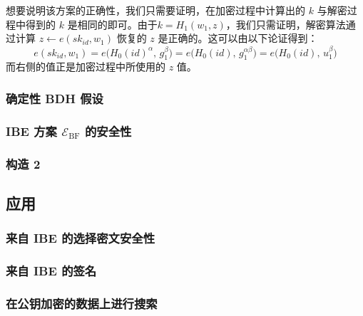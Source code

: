 想要说明该方案的正确性，我们只需要证明，在加密过程中计算出的 $k$ 与解密过程中得到的 $k$ 是相同的即可。由于$k=H_1(w_1,z)$，我们只需证明，解密算法通过计算 $z\leftarrow e(\mathit{sk}_\mathit{id},w_1)$ 恢复的 $z$ 是正确的。这可以由以下论证得到：
\[
e(\mathit{sk}_\mathit{id},w_1)
=e\big(H_0(\mathit{id})^\alpha,\,g_1^\beta\big)
=e\big(H_0(\mathit{id}),\,g_1^{\alpha\beta}\big)
=e\big(H_0(\mathit{id}),\,u_1^\beta\big)
\]
而右侧的值正是加密过程中所使用的 $z$ 值。

\subsubsection{确定性 BDH 假设}\label{subsubsec:15-6-3-2}

\begin{game}\label{game:15-7}
	
\end{game}

\begin{definition}\label{def:15-11}
	
\end{definition}

\subsubsection{IBE 方案 $\mathcal{E}_\mathrm{BF}$ 的安全性}\label{subsubsec:15-6-3-3}

\begin{theorem}\label{theo:15-6}
	
\end{theorem}

\subsubsection{构造 2}\label{subsubsec:15-6-3-4}

\begin{theorem}\label{theo:15-7}
	
\end{theorem}

\subsection{应用}\label{subsec:15-6-4}

\subsubsection{来自 IBE 的选择密文安全性}\label{subsubsec:15-6-4-1}

\begin{theorem}\label{theo:15-8}
	
\end{theorem}

\subsubsection{来自 IBE 的签名}\label{subsubsec:15-6-4-2}

\begin{theorem}\label{theo:15-9}
	
\end{theorem}

\subsubsection{在公钥加密的数据上进行搜索}\label{subsubsec:15-6-4-3}
